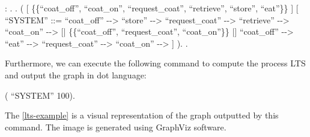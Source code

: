 \begin{coqdoccode}
	\coqdocnoindent
	  : .\coqdoceol
	\coqdocnoindent
	.\coqdoceol
	\coqdocindent{1.00em}
	 (\coqdoceol
	\coqdocindent{2.00em}
	\coqdoceol
	\coqdocindent{2.00em}
	[  \{\{``coat\_off'', ``coat\_on'', ``request\_coat'', ``retrieve'', ``store'', ``eat''\}\} ]\coqdoceol
	\coqdocindent{2.00em}
	[ ``SYSTEM'' ::=\coqdoceol
	\coqdocindent{3.00em}
	``coat\_off'' -{}-> ``store'' -{}-> ``request\_coat'' -{}-> ``retrieve'' -{}-> ``coat\_on'' -{}-> \coqdoceol
	\coqdocindent{3.00em}
	[| \{\{``coat\_off'', ``request\_coat'', ``coat\_on''\}\} |]\coqdoceol
	\coqdocindent{3.00em}
	``coat\_off'' -{}-> ``eat'' -{}-> ``request\_coat'' -{}-> ``coat\_on'' -{}->  ]\coqdoceol
	\coqdocindent{1.00em}
	).\coqdoceol
	\coqdocnoindent
	.\coqdoceol
\end{coqdoccode}

Furthermore, we can execute the following command to compute the process LTS and output the graph in dot language:

\begin{coqdoccode}
	\coqdocnoindent
	  (  ``SYSTEM'' 100).\coqdoceol
\end{coqdoccode}

The \autoref{lts-example} is a visual representation of the graph outputted by this command. The image is generated using GraphViz software.

